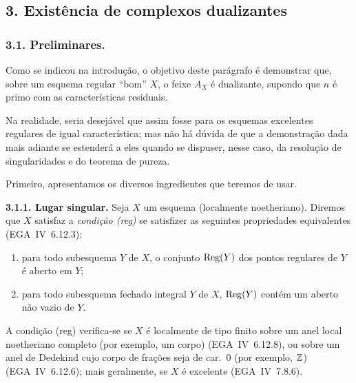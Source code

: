 \subsection*{3. Existência de complexos dualizantes}

\subsubsection*{3.1. Preliminares.}

Como se indicou na introdução, o objetivo deste parágrafo é demonstrar que, sobre um esquema regular 
\textquotedblleft bom\textquotedblright{} $X$, o feixe $A_X$ é dualizante, supondo que $n$ é primo com as características residuais.

Na realidade, seria desejável que assim fosse para os esquemas excelentes regulares de igual característica; mas não há dúvida de que a demonstração dada mais adiante se estenderá a eles quando se dispuser, nesse caso, da resolução de singularidades e do teorema de pureza.

Primeiro, apresentamos os diversos ingredientes que teremos de usar.

\textbf{3.1.1. Lugar singular.} Seja $X$ um esquema (localmente noetheriano). Diremos que $X$ satisfaz a \emph{condição (reg)} se satisfizer as seguintes propriedades equivalentes (EGA~IV~6.12.3):
\begin{enumerate}
\item[(i)] para todo subesquema $Y$ de $X$, o conjunto $\operatorname{Reg}(Y)$ dos pontos regulares de $Y$ é aberto em $Y$;
\item[(ii)] para todo subesquema fechado integral $Y$ de $X$, $\operatorname{Reg}(Y)$ contém um aberto não vazio de $Y$.
\end{enumerate}

A condição (reg) verifica-se se $X$ é localmente de tipo finito sobre um anel local noetheriano completo (por exemplo, um corpo) (EGA~IV~6.12.8), ou sobre um anel de Dedekind cujo corpo de frações seja de car.~0 (por exemplo, $\mathbb{Z}$) (EGA~IV~6.12.6); mais geralmente, se $X$ é excelente (EGA~IV~7.8.6).

